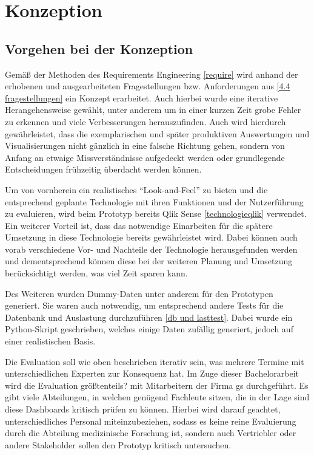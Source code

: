 \chapter{Konzeption}
\label{konzept}

\minitoc\pagebreak

\section{Vorgehen bei der Konzeption}


Gemäß der Methoden des Requirements Engineering \ref{require} wird anhand der erhobenen und ausgearbeiteten Fragestellungen bzw. Anforderungen aus \ref{4.4 fragestellungen} ein Konzept erarbeitet. 
Auch hierbei wurde eine iterative Herangehensweise gewählt, unter anderem um in einer kurzen Zeit grobe Fehler zu erkennen und viele Verbesserungen herauszufinden. 
Auch wird hierdurch gewährleistet, dass die exemplarischen und später produktiven Auswertungen und Visualisierungen nicht gänzlich in eine falsche Richtung gehen, sondern von Anfang an etwaige Missverständnisse aufgedeckt werden oder grundlegende Entscheidungen frühzeitig überdacht werden können.

Um von vornherein ein realistisches "`Look-and-Feel"' zu bieten und die entsprechend geplante Technologie mit ihren Funktionen und der Nutzerführung zu evaluieren, wird beim Prototyp bereits Qlik Sense \ref{technologieqlik} verwendet. 
Ein weiterer Vorteil ist, dass das notwendige Einarbeiten für die spätere Umsetzung in diese Technologie bereits gewährleistet wird. 
Dabei können auch vorab verschiedene Vor- und Nachteile der Technologie herausgefunden werden und dementsprechend können diese bei der weiteren Planung und Umsetzung berücksichtigt werden, was viel Zeit sparen kann.

Des Weiteren wurden Dummy-Daten unter anderem für den Prototypen generiert. 
Sie waren auch notwendig, um entsprechend andere Tests für die Datenbank und Auslastung durchzuführen \ref{db und lasttest}. 
Dabei wurde ein Python-Skript geschrieben, welches einige Daten zufällig generiert, jedoch auf einer realistischen Basis.

Die Evaluation soll wie oben beschrieben iterativ sein, was mehrere Termine mit unterschiedlichen Experten zur Konsequenz hat. 
Im Zuge dieser Bachelorarbeit wird die Evaluation größtenteils? mit Mitarbeitern der Firma gs durchgeführt. 
Es gibt viele Abteilungen, in welchen genügend Fachleute sitzen, die in der Lage sind diese Dashboards kritisch prüfen zu können. 
Hierbei wird darauf geachtet, unterschiedliches Personal miteinzubeziehen, sodass es keine reine Evaluierung durch die Abteilung medizinische Forschung ist, sondern auch Vertriebler oder andere Stakeholder sollen den Prototyp kritisch untersuchen.

